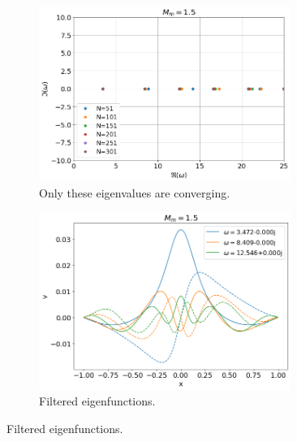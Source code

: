 \documentclass{article}
\begin{document}
\begin{figure}[H]
\begin{subfigure}[b]{0.5\textwidth}
            \includegraphics*[width=0.9\textwidth]{img/eigvals-Mm=1.5-filtered.png}
            \caption{Only these eigenvalues are converging.}
        \end{subfigure}%
        \begin{subfigure}[b]{0.5\textwidth}
            \includegraphics*[width=0.9\textwidth]{img/eigfuncs-Mm=1.5-filtered.png}
            \caption{Filtered eigenfunctions.}
        \end{subfigure}
    \end{figure}
\end{document}

